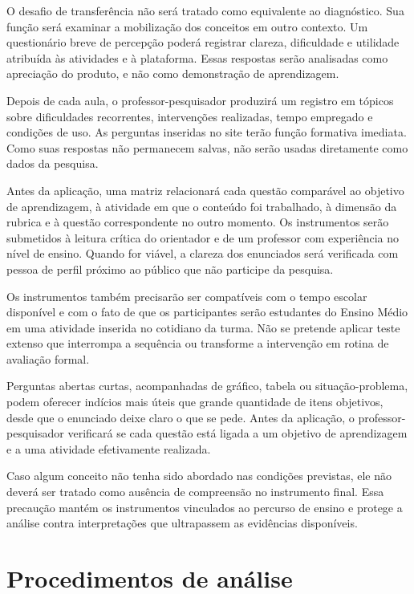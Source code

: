O desafio de transferência não será tratado como equivalente ao diagnóstico. Sua função será examinar a mobilização dos conceitos em outro contexto. Um questionário breve de percepção poderá registrar clareza, dificuldade e utilidade atribuída às atividades e à plataforma. Essas respostas serão analisadas como apreciação do produto, e não como demonstração de aprendizagem.

Depois de cada aula, o professor-pesquisador produzirá um registro em tópicos sobre dificuldades recorrentes, intervenções realizadas, tempo empregado e condições de uso. As perguntas inseridas no site terão função formativa imediata. Como suas respostas não permanecem salvas, não serão usadas diretamente como dados da pesquisa.

Antes da aplicação, uma matriz relacionará cada questão comparável ao objetivo de aprendizagem, à atividade em que o conteúdo foi trabalhado, à dimensão da rubrica e à questão correspondente no outro momento. Os instrumentos serão submetidos à leitura crítica do orientador e de um professor com experiência no nível de ensino. Quando for viável, a clareza dos enunciados será verificada com pessoa de perfil próximo ao público que não participe da pesquisa.

Os instrumentos também precisarão ser compatíveis com o tempo escolar disponível e com o fato de que os participantes serão estudantes do Ensino Médio em uma atividade inserida no cotidiano da turma. Não se pretende aplicar teste extenso que interrompa a sequência ou transforme a intervenção em rotina de avaliação formal.

Perguntas abertas curtas, acompanhadas de gráfico, tabela ou situação-problema, podem oferecer indícios mais úteis que grande quantidade de itens objetivos, desde que o enunciado deixe claro o que se pede. Antes da aplicação, o professor-pesquisador verificará se cada questão está ligada a um objetivo de aprendizagem e a uma atividade efetivamente realizada.

Caso algum conceito não tenha sido abordado nas condições previstas, ele não deverá ser tratado como ausência de compreensão no instrumento final. Essa precaução mantém os instrumentos vinculados ao percurso de ensino e protege a análise contra interpretações que ultrapassem as evidências disponíveis.

\section{Procedimentos de análise}

